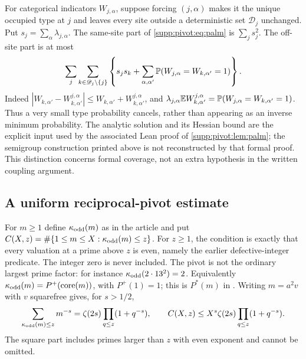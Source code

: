 For categorical indicators $W_{j,\alpha}$, suppose forcing $(j,\alpha)$ makes it the unique occupied type at $j$ and leaves every site outside a deterministic set $\mathscr D_j$ unchanged. Put $s_j=\sum_\alpha\lambda_{j,\alpha}$. The same-site part of \eqref{supp:pivot:eq:palm} is $\sum_j s_j^2$. The off-site part is at most
\begin{equation}\label{supp:pivot:eq:categorical}
 \sum_j\sum_{k\in\mathscr D_j\setminus\{j\}}
 \left\{s_js_k+\sum_{\alpha,\alpha'}
           \mathbb P(W_{j,\alpha}=W_{k,\alpha'}=1)\right\}.
\end{equation}
Indeed $|W_{k,\alpha'}-W^{j,\alpha}_{k,\alpha'}|
\le W_{k,\alpha'}+W^{j,\alpha}_{k,\alpha'}$, and
$\lambda_{j,\alpha}\mathbb E W^{j,\alpha}_{k,\alpha'}
=\mathbb P(W_{j,\alpha}=W_{k,\alpha'}=1)$.
Thus a very small type probability cancels, rather than appearing as an inverse minimum probability.
The analytic solution and its Hessian bound are the explicit input used
by the associated Lean proof of \cref{supp:pivot:lem:palm}; the semigroup
construction printed above is not reconstructed by that formal proof.
This distinction concerns formal coverage, not an extra hypothesis in
the written coupling argument.

\subsection{A uniform reciprocal-pivot estimate}
For $m\ge1$ define $\kappa_{\rm odd}(m)$ as in the article and put
$C(X,z)=\#\{1\le m\le X:\kappa_{\rm odd}(m)\le z\}$.
For $z\ge1$, the condition is exactly that every valuation at a prime
above $z$ is even, namely the earlier defective-integer predicate.
The integer zero is never included.
The pivot is not the ordinary largest prime factor: for instance
$\kappa_{\rm odd}(2\cdot13^2)=2$.
Equivalently $\kappa_{\rm odd}(m)=P^+(\operatorname{core}(m))$,
with $P^+(1)=1$; this is $P^*(m)$ in
\cite[eq.~(5)]{deLaBretecheWangXu2026}.
Writing $m=a^2v$ with $v$ squarefree gives, for $s>1/2$,
\begin{equation}\label{supp:pivot:eq:rankin-finite}
 \sum_{\kappa_{\rm odd}(m)\le z}m^{-s}
   =\zeta(2s)\prod_{q\le z}(1+q^{-s}),\qquad
 C(X,z)\le X^s\zeta(2s)\prod_{q\le z}(1+q^{-s}).
\end{equation}
The square part includes primes larger than $z$ with even exponent and cannot be omitted.

